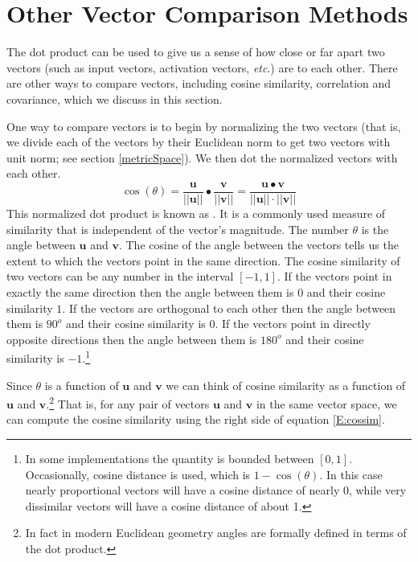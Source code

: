 \section{Other Vector Comparison Methods}\label{vector_comparisons}

The dot product can be used to give us a sense of
how close or far apart two vectors (such as input vectors, activation vectors, 
\emph{etc}.) are to each other.  There are other ways to compare vectors, including cosine similarity,
correlation and covariance, which we discuss in this section.

   One way to compare vectors is to begin by normalizing the two vectors (that is, we divide each
of the vectors by their Euclidean norm to get two vectors with unit norm; see 
section \ref{metricSpace}).  We then dot the normalized vectors with each 
other.
\begin{equation}\label{E:cossim}
\cos(\theta) = 
\frac{\mathbf{u}}{|| \mathbf{u}||}  \bullet 
\frac{\mathbf{v}}{|| \mathbf{v}||} =
\frac{\mathbf{u} \bullet \mathbf{v}}{|| \mathbf{u}||  \cdot 
||\mathbf{v}||}
\end{equation}
This normalized dot product is known as .  It is a 
commonly used measure of similarity that is independent of the vector's 
magnitude.  The number $\theta$ is the angle between $\mathbf{u}$ and 
$\mathbf{v}$.  The cosine of the angle between the vectors tells us the extent 
to which the vectors point in the same direction.  The cosine similarity of two 
vectors can be any number in the interval $[-1, 1]$.  If the vectors point in 
exactly the same direction then the angle between them is $0$ and their cosine 
similarity $1$.  If the vectors are orthogonal to each other then the angle 
between them is $90^o$ and their cosine similarity is $0$.  If the vectors 
point in directly opposite directions then the angle between them is $180^o$ 
and their cosine similarity is $-1$.\footnote{In some implementations the
quantity is bounded between $[0,1]$.  Occasionally, cosine distance is used, 
which is $1 - \cos(\theta)$.  In this case nearly proportional vectors 
will have a cosine distance of nearly 0, while very dissimilar vectors will 
have a cosine distance of about 1.}

Since $\theta$ is a function of  $\mathbf{u}$ and  $\mathbf{v}$ 
we can think of cosine similarity as a function of  $\mathbf{u}$ and  $\mathbf{v}$.\footnote{In fact in modern Euclidean geometry 
angles are formally defined in terms of the dot product.}  
That is, for any pair of vectors $\mathbf{u}$ and  $\mathbf{v}$ in the same vector space, we can compute the cosine similarity 
using the right side of equation \eqref{E:cossim}.

